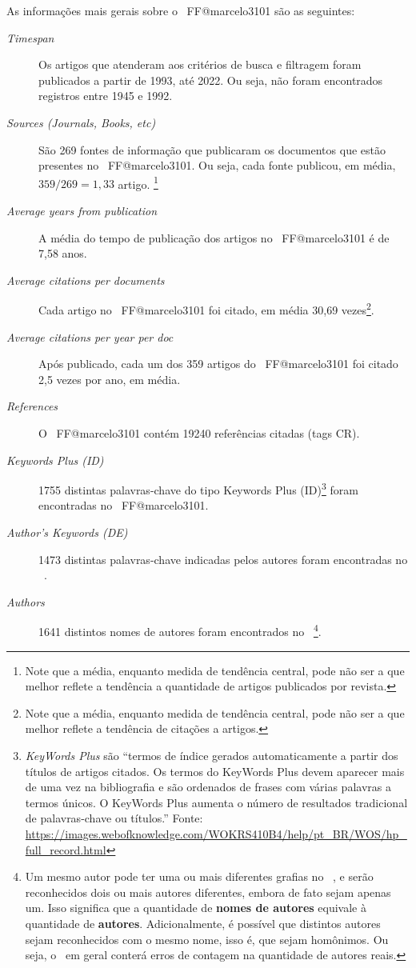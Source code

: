 As informações mais gerais sobre o \dataset\   FF@marcelo3101 são as seguintes:
\begin{description}
    \item [\textit{Timespan}] Os artigos que atenderam aos critérios de busca e filtragem foram publicados a partir de 1993, até 2022. Ou seja, não foram encontrados registros entre 1945 e 1992.
    \item [\textit{Sources (Journals, Books, etc)}] São 269 fontes de informação que publicaram os documentos que estão presentes no \dataset\   FF@marcelo3101. Ou seja, cada fonte publicou, em média, $359/269=1,33$ artigo. \footnote{Note que a média, enquanto medida de tendência central, pode não ser a que melhor reflete a tendência a quantidade de artigos publicados por revista.}
    \item [\textit{Average years from publication}] A média do tempo de publicação dos artigos no \dataset\   FF@marcelo3101 é de 7,58 anos.
    \item [\textit{Average citations per documents}] Cada artigo no \dataset\   FF@marcelo3101 foi citado, em média 30,69 vezes\footnote{Note que a média, enquanto medida de tendência central, pode não ser a que melhor reflete a tendência de  citações a artigos.}.
    \item [\textit{Average citations per year per doc}] Após publicado, cada um dos 359 artigos do \dataset\   FF@marcelo3101  foi citado 2,5 vezes por ano, em média.
    \item [\textit{References}] O \dataset\  FF@marcelo3101 contém 19240 referências citadas (tags CR).
    \item [\textit{Keywords Plus (ID)}] 1755 distintas palavras-chave do tipo Keywords Plus (ID)\footnote{\textit{KeyWords Plus} são ``termos de índice gerados automaticamente a partir dos títulos de artigos citados. Os termos do KeyWords Plus devem aparecer mais de uma vez na bibliografia e são ordenados de frases com várias palavras a termos únicos. O KeyWords Plus aumenta o número de resultados tradicional de palavras-chave ou títulos.'' Fonte: \url{https://images.webofknowledge.com/WOKRS410B4/help/pt_BR/WOS/hp_full_record.html}} foram encontradas no \dataset\   FF@marcelo3101. 
    \item [\textit{Author's Keywords (DE)}] 1473 distintas palavras-chave indicadas pelos autores foram encontradas no \dataset\  .
    \item [\textit{Authors}] 1641 distintos nomes de autores foram encontrados no \dataset\  \footnote{Um mesmo autor pode ter uma ou mais diferentes grafias no \dataset\  , e serão reconhecidos dois ou mais autores diferentes, embora de fato sejam apenas um. Isso significa que a quantidade de \textbf{nomes de autores} equivale à quantidade de \textbf{autores}. Adicionalmente, é possível que distintos autores sejam reconhecidos com o mesmo nome, isso é, que sejam homônimos. Ou seja, o \dataset\   em geral conterá erros de contagem na quantidade de autores reais.}.

\end{description}
